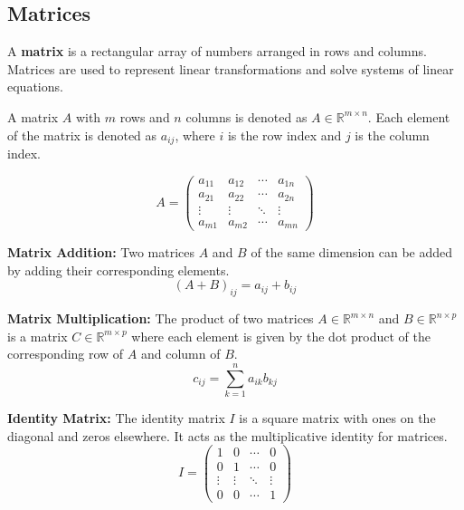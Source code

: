 \documentclass[11pt]{article}
\begin{document}
\subsection{Matrices}
A \textbf{matrix} is a rectangular array of numbers arranged in rows and
columns. Matrices are used to represent linear transformations and solve
systems of linear equations.

\begin{definition}
	A matrix \(A\) with \(m\) rows and \(n\) columns is denoted as \(A \in \mathbb{R}^{m \times n}\). Each element of the matrix is denoted as \(a_{ij}\), where \(i\) is the row index and \(j\) is the column index.
\end{definition}

\begin{equation}
	A = \begin{pmatrix}
		a_{11} & a_{12} & \cdots & a_{1n} \\
		a_{21} & a_{22} & \cdots & a_{2n} \\
		\vdots & \vdots & \ddots & \vdots \\
		a_{m1} & a_{m2} & \cdots & a_{mn}
	\end{pmatrix}
\end{equation}

\textbf{Matrix Addition:} Two matrices \(A\) and \(B\) of the same dimension can be added by adding their corresponding elements.
\begin{equation}
	(A + B)_{ij} = a_{ij} + b_{ij}
\end{equation}

\textbf{Matrix Multiplication:} The product of two matrices \(A \in \mathbb{R}^{m \times n}\) and \(B \in \mathbb{R}^{n \times p}\) is a matrix \(C \in \mathbb{R}^{m \times p}\) where each element is given by the dot product of the corresponding row of \(A\) and column of \(B\).
\begin{equation}
	c_{ij} = \sum_{k=1}^{n} a_{ik} b_{kj}
\end{equation}

\textbf{Identity Matrix:} The identity matrix \(I\) is a square matrix with ones on the diagonal and zeros elsewhere. It acts as the multiplicative identity for matrices.
\begin{equation}
	I = \begin{pmatrix}
		1      & 0      & \cdots & 0      \\
		0      & 1      & \cdots & 0      \\
		\vdots & \vdots & \ddots & \vdots \\
		0      & 0      & \cdots & 1
	\end{pmatrix}
\end{equation}
\end{document}
